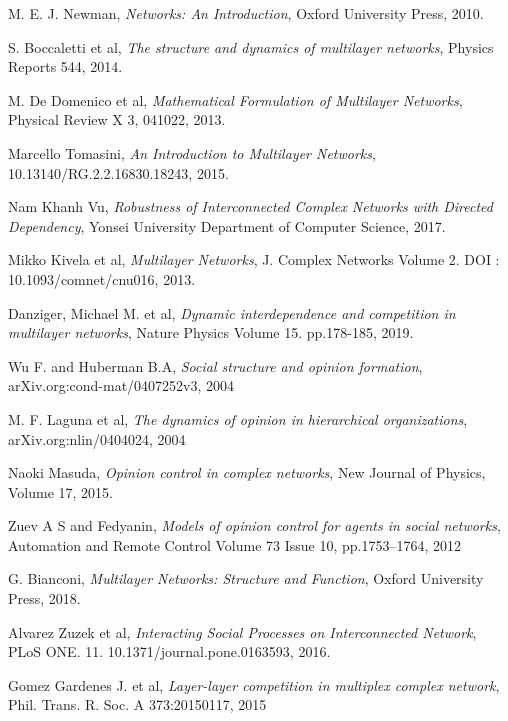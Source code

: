 \documentclass[english]{cccconf}
\begin{document}
\begin{thebibliography}{0}
M. E. J. Newman, \textit{Networks: An Introduction}, Oxford University Press, 2010.

S. Boccaletti et al, \textit{The structure and dynamics of multilayer networks}, Physics Reports 544, 2014.

M. De Domenico et al, \textit{Mathematical Formulation of Multilayer Networks}, Physical Review X 3, 041022, 2013.

Marcello Tomasini, \textit{An Introduction to Multilayer Networks}, 10.13140/RG.2.2.16830.18243, 2015.

Nam Khanh Vu, \textit{Robustness of Interconnected Complex Networks with Directed Dependency}, Yonsei University Department of Computer Science, 2017.

Mikko Kivela et al, \textit{Multilayer Networks}, J. Complex Networks Volume 2. DOI : 10.1093/comnet/cnu016, 2013.

Danziger, Michael M. et al, \textit{Dynamic interdependence and competition in multilayer networks}, Nature Physics Volume 15. pp.178-185, 2019.

Wu F. and Huberman B.A, \textit{Social structure and opinion formation}, arXiv.org:cond-mat/0407252v3, 2004

M. F. Laguna et al, \textit{The dynamics of opinion in hierarchical organizations}, arXiv.org:nlin/0404024, 2004 

Naoki Masuda, \textit{Opinion control in complex networks}, New Journal of Physics, Volume 17, 2015.

Zuev A S and Fedyanin, 
\textit{Models of opinion control for agents in social networks}, Automation and Remote Control Volume 73 Issue 10, pp.1753–1764, 2012 

G. Bianconi, \textit{Multilayer Networks: Structure and Function}, Oxford University Press, 2018.

Alvarez Zuzek et al, \textit{Interacting Social Processes on Interconnected Network}, PLoS ONE. 11. 10.1371/journal.pone.0163593, 2016.

Gomez Gardenes J. et al, \textit{Layer-layer competition in multiplex complex network}, Phil. Trans. R. Soc. A 373:20150117, 2015


\end{thebibliography}
\end{document}
